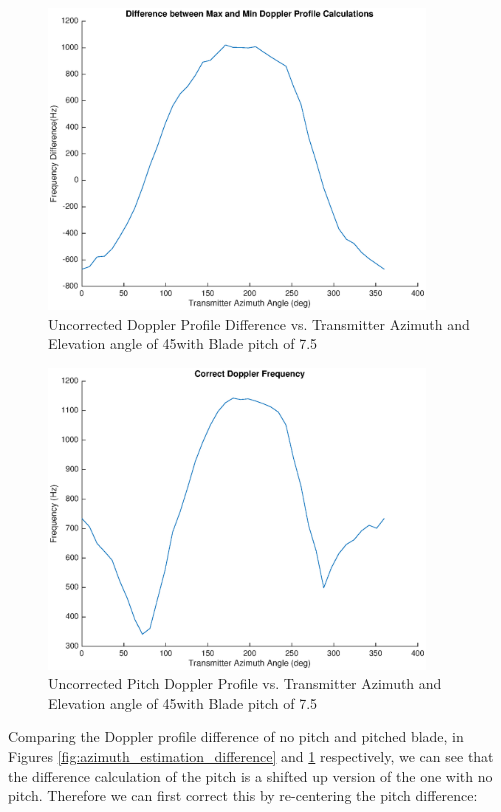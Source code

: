 \begin{figure}
	\begin{center}
		\includegraphics[width=10cm]{images/results/difference_pitch_noCorrection.eps}
		\caption{Uncorrected Doppler Profile Difference vs. Transmitter Azimuth and Elevation angle of 45\textdegree with Blade pitch of 7.5\textdegree}
		\label{fig:diff_pitch_noCorrection}
	\end{center}
\end{figure}

\begin{figure}
	\begin{center}
		\includegraphics[width=10cm]{images/results/correct_dop_pitch_noCorrection.eps}
		\caption{Uncorrected Pitch Doppler Profile vs. Transmitter Azimuth and Elevation angle of 45\textdegree with Blade pitch of 7.5\textdegree}
		\label{fig:dop_pitch_noCorrection}
	\end{center}
\end{figure}

Comparing the Doppler profile difference of no pitch and pitched blade, in Figures \ref{fig:azimuth_estimation_difference} and \ref{fig:diff_pitch_noCorrection} respectively, we can see that the difference calculation of the pitch is a shifted up version of the one with no pitch. Therefore we can first correct this by re-centering the pitch difference: 

